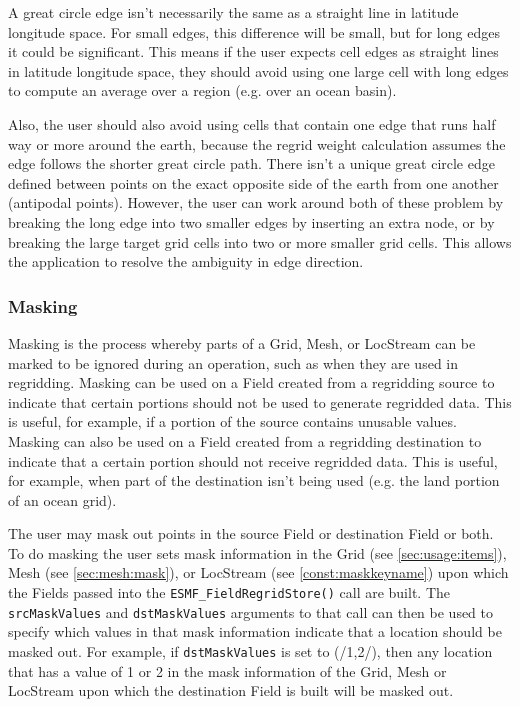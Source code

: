  A great circle edge isn't necessarily the same as a straight line in latitude longitude space. 
 For small edges, this difference will be small, but for long edges it
 could be significant. This means if the user expects cell edges as straight lines in latitude longitude 
 space, they should avoid using one large cell with 
 long edges to compute an average over a region (e.g. over an ocean basin).

 Also, the  user should also avoid using cells that contain one edge that runs half way or more around the earth, because the 
 regrid weight calculation assumes the edge follows the shorter great circle path. 
 There isn't a unique great circle edge defined between points on the 
 exact opposite side of the earth from one another (antipodal points). 
 However, the user can work around both of these problem by breaking the long edge into two smaller edges by inserting 
 an extra node, or by breaking the large target grid cells 
 into two or more smaller grid cells. This allows the application to resolve the ambiguity in edge direction. 

\subsubsection{Masking}
\label {regrid:masking}
Masking is the process whereby parts of a Grid, Mesh, or LocStream 
can be marked to be ignored during an operation, such as when they 
are used in regridding.  Masking can be used on a Field created from 
a regridding source to indicate that certain portions should not be 
used to generate regridded data.  This is useful, for example, if a 
portion of the source contains unusable values.  Masking can also be 
used on a Field created from a regridding destination to indicate 
that a certain portion should not receive regridded data.  This is 
useful, for example, when part of the destination isn't being used 
(e.g. the land portion of an ocean grid).

The user may mask out points in the source
Field or destination Field or both. To do masking the user sets
mask information in the Grid (see \ref{sec:usage:items}), Mesh
(see \ref{sec:mesh:mask}), or LocStream (see \ref{const:maskkeyname})
upon which the Fields passed into the
{\tt ESMF\_FieldRegridStore()} call are built. The {\tt srcMaskValues}
and {\tt dstMaskValues} arguments to that
call can then be used to specify which values in that mask
information indicate that a location should be masked out. For
example, if {\tt dstMaskValues} is set to (/1,2/), then any location that
has a value of 1 or 2 in the mask information of the Grid, Mesh or LocStream
upon which the destination Field is built will be masked out.

